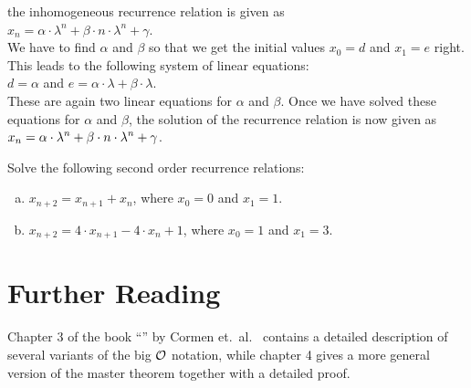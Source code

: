 the inhomogeneous recurrence relation is given as 
\\[0.2cm]
\hspace*{1.3cm}
$x_n = \alpha \cdot \lambda^n + \beta \cdot n \cdot \lambda^n + \gamma$.
\\[0.2cm]
We have to find $\alpha$ and $\beta$ so that we get the initial values $x_0 = d$ and $x_1 = e$ right.
This leads to the following system of linear equations:
\\[0.2cm]
\hspace*{1.3cm}
$d = \alpha$ \quad and \quad $e = \alpha \cdot \lambda + \beta \cdot \lambda$.
\\[0.2cm]
These are again two linear equations for $\alpha$ and $\beta$.  Once we have solved these equations for $\alpha$ and
$\beta$, the solution of the recurrence relation is now given as
\\[0.2cm]
\hspace*{1.3cm}
$\displaystyle x_{n} = \alpha \cdot \lambda^n + \beta \cdot n \cdot \lambda^n + \gamma$.


\exercise
 Solve the following second order recurrence relations:
\begin{enumerate}[(a)]
\item $x_{n+2} = x_{n+1} + x_n$, \quad where $x_0 = 0$ and $x_1 = 1$.  
\item $x_{n+2} = 4 \cdot x_{n+1} - 4 \cdot x_n + 1$, \quad where $x_0 = 1$ and $x_1 = 3$.  \eox
\end{enumerate}


\section{Further Reading}
Chapter 3 of the book ``'' by Cormen et.~al.~\cite{cormen:09}
contains a detailed description of several variants of the big $\mathcal{O}$ notation, while
chapter 4 gives a more general version of the master theorem together with a detailed proof.

